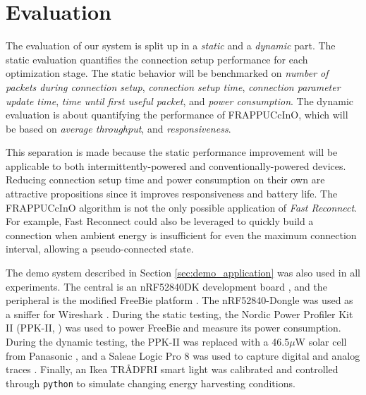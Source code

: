 \chapter{Evaluation}
\label{chp:chapter_4}
The evaluation of our system is split up in a \textit{static} and a \textit{dynamic} part. The static evaluation quantifies the connection setup performance for each optimization stage. The static behavior will be benchmarked on \textit{number of packets during connection setup}, \textit{connection setup time}, \textit{connection parameter update time}, \textit{time until first useful packet}, and \textit{power consumption}. The dynamic evaluation is about quantifying the performance of FRAPPUCcInO, which will be based on \textit{average throughput}, and \textit{responsiveness}.

This separation is made because the static performance improvement will be applicable to both intermittently-powered and conventionally-powered devices. Reducing connection setup time and power consumption on their own are attractive propositions since it improves responsiveness and battery life. The FRAPPUCcInO algorithm is not the only possible application of \textit{Fast Reconnect}. For example, Fast Reconnect could also be leveraged to quickly build a connection when ambient energy is insufficient for even the maximum connection interval, allowing a pseudo-connected state. 

\label{sec:evaluation_setup}
The demo system described in Section \ref{sec:demo_application} was also used in all experiments. The central is an nRF52840DK development board \cite{nordic_nrf52840dk}, and the peripheral is the modified FreeBie platform \cite{freebie}. The nRF52840-Dongle was used as a sniffer for Wireshark \cite{nordic_dongle}. During the static testing, the Nordic Power Profiler Kit II (PPK-II, \cite{nordic_ppk2}) was used to power FreeBie and measure its power consumption. During the dynamic testing, the PPK-II was replaced with a 46.5$\mu\text{W}$ solar cell from Panasonic \cite{panasonic_solar}, and a Saleae Logic Pro 8 was used to capture digital and analog traces \cite{saleae_logic_pro_8}. Finally, an Ikea TRÅDFRI smart light was calibrated and controlled through \texttt{python} to simulate changing energy harvesting conditions. 

